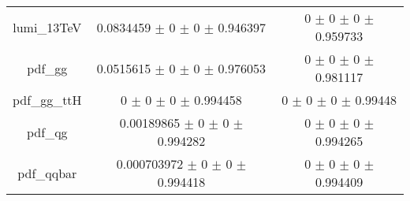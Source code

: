 \begin{table}
\begin{tabular}{ccc}
lumi\_13TeV & \num{0.0834459} $\pm$ \num{0} $\pm$ \num{0} $\pm$ \num{0.946397} & \num{0} $\pm$ \num{0} $\pm$ \num{0} $\pm$ \num{0.959733}\\
pdf\_gg & \num{0.0515615} $\pm$ \num{0} $\pm$ \num{0} $\pm$ \num{0.976053} & \num{0} $\pm$ \num{0} $\pm$ \num{0} $\pm$ \num{0.981117}\\
pdf\_gg\_ttH & \num{0} $\pm$ \num{0} $\pm$ \num{0} $\pm$ \num{0.994458} & \num{0} $\pm$ \num{0} $\pm$ \num{0} $\pm$ \num{0.99448}\\
pdf\_qg & \num{0.00189865} $\pm$ \num{0} $\pm$ \num{0} $\pm$ \num{0.994282} & \num{0} $\pm$ \num{0} $\pm$ \num{0} $\pm$ \num{0.994265}\\
pdf\_qqbar & \num{0.000703972} $\pm$ \num{0} $\pm$ \num{0} $\pm$ \num{0.994418} & \num{0} $\pm$ \num{0} $\pm$ \num{0} $\pm$ \num{0.994409}\\
\bottomrule
\end{tabular}
\end{table}
